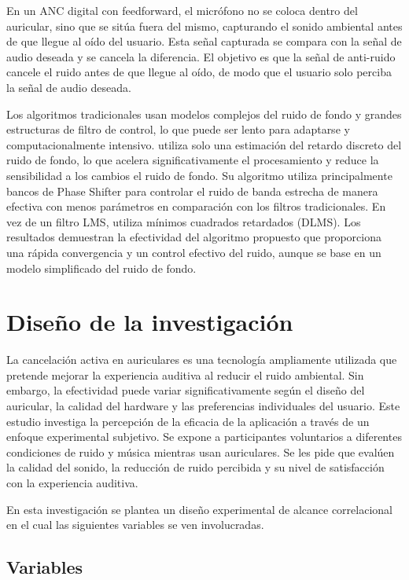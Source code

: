 \documentclass[a4paper,12pt]{article}
\begin{document}
En un ANC digital con feedforward, el micrófono no se coloca dentro del auricular, sino que se sitúa fuera del mismo, capturando el sonido ambiental antes de que llegue al oído del usuario.
Esta señal capturada se compara con la señal de audio deseada y se cancela la diferencia.
El objetivo es que la señal de anti-ruido cancele el ruido antes de que llegue al oído, de modo que el usuario solo perciba la señal de audio deseada.

Los algoritmos tradicionales usan modelos complejos del ruido de fondo y grandes estructuras de filtro de control, lo que puede ser lento para adaptarse y computacionalmente intensivo.
\textcite{Pawelczyk2000} utiliza solo una estimación del retardo discreto del ruido de fondo, lo que acelera significativamente el procesamiento y reduce la sensibilidad a los cambios el ruido de fondo.
Su algoritmo utiliza principalmente bancos de Phase Shifter para controlar el ruido de banda estrecha de manera efectiva con menos parámetros en comparación con los filtros tradicionales.
En vez de un filtro LMS, utiliza mínimos cuadrados retardados (DLMS).
Los resultados demuestran la efectividad del algoritmo propuesto que proporciona una rápida convergencia y un control efectivo del ruido, aunque se base en un modelo simplificado del ruido de fondo.

\section{Diseño de la investigación}

La cancelación activa en auriculares es una tecnología ampliamente utilizada que pretende mejorar la experiencia auditiva al reducir el ruido ambiental.
Sin embargo, la efectividad puede variar significativamente según el diseño del auricular, la calidad del hardware y las preferencias individuales del usuario.
Este estudio investiga la percepción de la eficacia de la aplicación a través de un enfoque experimental subjetivo.
Se expone a participantes voluntarios a diferentes condiciones de ruido y música mientras usan auriculares.
Se les pide que evalúen la calidad del sonido, la reducción de ruido percibida y su nivel de satisfacción con la experiencia auditiva.

En esta investigación se plantea un diseño experimental de alcance correlacional en el cual las siguientes variables se ven involucradas.

\subsection{Variables}
\label{sec:variables}
\end{document}

